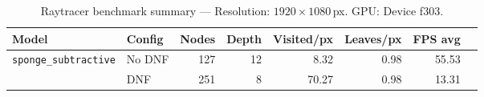 
\begin{table}[htbp]
  \centering\small
  \setlength{\tabcolsep}{4pt}
  \caption{Raytracer benchmark summary --- Resolution: $1920\times1080$\,px. GPU: Device f303.}
  \label{tab:rt-summary}
  \begin{tabular}{@{}llrrrrrr@{}}
    \toprule
    \textbf{Model} & \textbf{Config} & \textbf{Nodes} & \textbf{Depth} & \textbf{Visited/px} & \textbf{Leaves/px} & \textbf{FPS avg} \\
    \midrule
    \multirow{2}{*}{\texttt{sponge\_subtractive}} & No DNF & 127 & 12 & 8.32 & 0.98 & 55.53 \\
     & DNF & 251 & 8 & 70.27 & 0.98 & 13.31 \\
    \bottomrule
  \end{tabular}
\end{table}
